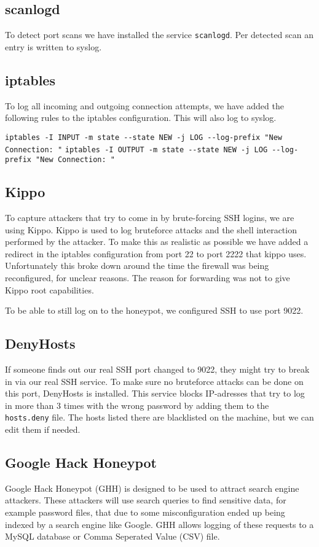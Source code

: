 \documentclass[11pt]{article} %
\begin{document}
\subsection{scanlogd}
To detect port scans we have installed the service \verb|scanlogd|.
Per detected scan an entry is written to syslog.

\subsection{iptables}
To log all incoming and outgoing connection attempts, we have added the following rules to the iptables configuration. 
This will also log to syslog.

\verb|iptables -I INPUT -m state --state NEW -j LOG --log-prefix "New Connection: "|
\verb|iptables -I OUTPUT -m state --state NEW -j LOG --log-prefix "New Connection: "|

\subsection{Kippo}
To capture attackers that try to come in by brute-forcing SSH logins, we are using Kippo. 
Kippo is used to log bruteforce attacks and the shell interaction performed by the attacker. 
To make this as realistic as possible we have added a redirect in the iptables configuration from port 22 to port 2222 that kippo uses. 
Unfortunately this broke down around the time the firewall was being reconfigured, for unclear reasons. 
The reason for forwarding was not to give Kippo root capabilities.

To be able to still log on to the honeypot, we configured SSH to use port 9022.

\subsection{DenyHosts}
If someone finds out our real SSH port changed to 9022, they might try to break in via our real SSH service.
To make sure no bruteforce attacks can be done on this port, DenyHosts is installed.
This service blocks IP-adresses that try to log in more than 3 times with the wrong password by adding them to the \verb|hosts.deny| file.
The hosts listed there are blacklisted on the machine, but we can edit them if needed.

\subsection{Google Hack Honeypot}
Google Hack Honeypot (GHH) is designed to be used to attract search engine attackers. 
These attackers will use search queries to find sensitive data, for example password files, that due to some misconfiguration ended up being indexed by a search engine like Google.
GHH allows logging of these requests to a MySQL database or Comma Seperated Value (CSV) file.
\end{document}
